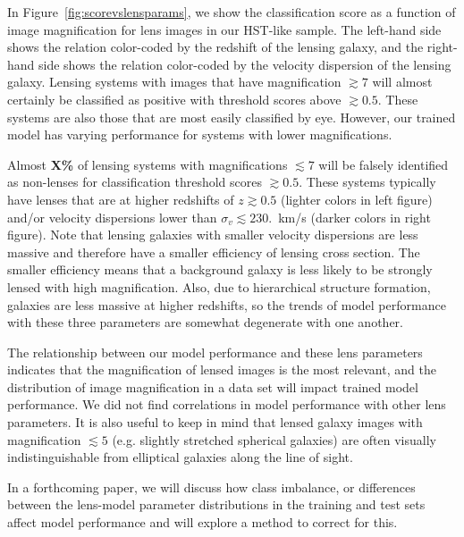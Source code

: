 \documentclass{emulateapj}
\newcommand{\todo}[1]{{\bf\color{blue} #1}}
\def\gsim{\gtrsim}
\def\lsim{\lesssim}
\begin{document}
In Figure~\ref{fig:scorevslensparams}, we show the classification
score as a function of image magnification for lens images in our
HST-like sample.  The left-hand side shows the relation color-coded by
the redshift of the lensing galaxy, and the right-hand side shows the
relation color-coded by the velocity dispersion of the lensing galaxy.
Lensing systems with images that have magnification $\gsim7$ will
almost certainly be classified as positive with threshold scores above
$\gsim0.5$.  These systems are also those that are most easily
classified by eye.  However, our trained model has varying performance
for systems with lower magnifications.



Almost \todo{X\%} of lensing systems with magnifications $\lsim7$ will
be falsely identified as non-lenses for classification threshold
scores $\gsim0.5$.  These systems typically have lenses that are at
higher redshifts of $z\gsim0.5$ (lighter colors in left figure) and/or
velocity dispersions lower than $\sigma_v\lsim230.$~km/s (darker
colors in right figure).  Note that lensing galaxies with smaller
velocity dispersions are less massive and therefore have a smaller
efficiency of lensing cross section.  The smaller efficiency means
that a background galaxy is less likely to be strongly lensed with
high magnification.  Also, due to hierarchical structure formation,
galaxies are less massive at higher redshifts, so the trends of model
performance with these three parameters are somewhat degenerate with
one another.  

The relationship between our model performance and these lens
parameters indicates that the magnification of lensed images is the
most relevant, and the distribution of image magnification in a data
set will impact trained model performance.  We did not find
correlations in model performance with other lens parameters.  It is
also useful to keep in mind that lensed galaxy images with
magnification $\lsim5$ (e.g. slightly stretched spherical galaxies)
are often visually indistinguishable from elliptical galaxies along
the line of sight.  

In a forthcoming paper, we will discuss how class imbalance, or
differences between the lens-model parameter distributions in the
training and test sets affect model performance and will explore a
method to correct for this.
\begin{figure*}[t]
  \centering 
  \mbox{
    \hfill
  } 
\caption{Image classification score on HST mock data as a function of
  lensed image magnification.  Left color-coded by redshift, right is
  color coded by the lens velocity dispersion.}
\label{fig:scorevslensparams}
\end{figure*}
\end{document}
